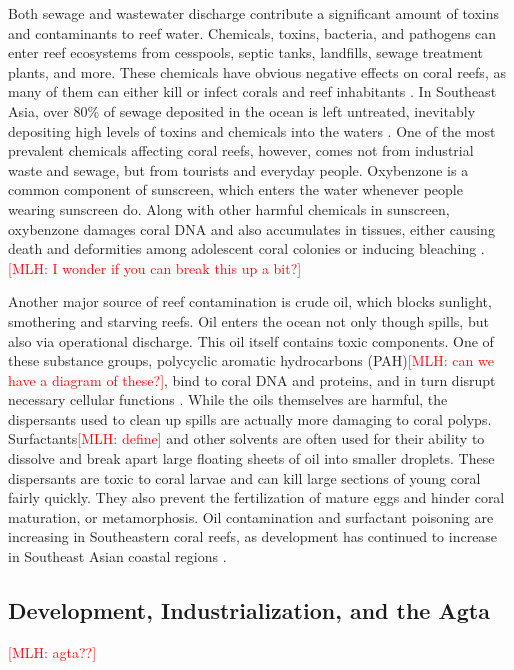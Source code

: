 \documentclass{book}\usepackage{knitr}
\newcommand{\red}[1]{\textcolor{red}{[MLH: #1]}}
\begin{document}
\begin{knitrout}
\begin{kframe}
{Both sewage and wastewater discharge contribute a significant amount of toxins and contaminants to reef water. Chemicals, toxins, bacteria, and pathogens can enter reef ecosystems from cesspools, septic tanks, landfills, sewage treatment plants, and more. These chemicals have obvious negative effects on coral reefs, as many of them can either kill or infect corals and reef inhabitants \citep{coralreefalliance_2021}. In Southeast Asia, over 80\% of sewage deposited in the ocean is left untreated, inevitably depositing high levels of toxins and chemicals into the waters \citep{4884777420100401}. One of the most prevalent chemicals affecting coral reefs, however, comes not from industrial waste and sewage, but from tourists and everyday people. Oxybenzone is a common component of sunscreen, which enters the water whenever people wearing sunscreen do. Along with other harmful chemicals in sunscreen, oxybenzone damages coral DNA and also accumulates in tissues, either causing death and deformities among adolescent coral colonies or inducing bleaching \citep{USEPA_2017}.\red{I wonder if you can break this up a bit?}

Another major source of reef contamination is crude oil, which blocks sunlight, smothering and starving reefs. Oil enters the ocean not only though spills, but also via operational discharge. This oil itself contains toxic components. One of these substance groups, polycyclic aromatic hydrocarbons (PAH)\red{can we have a diagram of these?}, bind to coral DNA and proteins, and in turn disrupt necessary cellular functions \citep{4884777420100401}. While the oils themselves are harmful, the dispersants used to clean up spills are actually more damaging to coral polyps. Surfactants\red{define} and other solvents are often used for their ability to dissolve and break apart large floating sheets of oil into smaller droplets. These dispersants are toxic to coral larvae and can kill large sections of young coral fairly quickly. They also prevent the fertilization of mature eggs and hinder coral maturation, or metamorphosis. Oil contamination and surfactant poisoning are increasing in Southeastern coral reefs, as development has continued to increase in Southeast Asian coastal regions \citep{2615280620070801}.

\subsection{Development, Industrialization, and the Agta}\red{agta??}

}
\end{kframe}
\end{knitrout}
\end{document}
